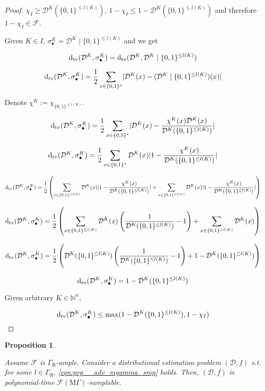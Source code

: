 \documentclass[11pt]{article}
\numberwithin{equation}{section}
\theoremstyle{definition}
\theoremstyle{plain}
\newtheorem{proposition}{Proposition}[section]
\newcommand{\Bool}{\{0,1\}}
\newcommand{\Words}{{\Bool^*}}
\newcommand{\WordsLen}[1]{{\Bool^{#1}}}
\newcommand{\Dtv}{\operatorname{d}_{\textnormal{tv}}}
\newcommand{\Nats}{\mathbb{N}}
\newcommand{\Abs}[1]{\lvert #1 \rvert}
\newcommand{\Dist}{\mathcal{D}}
\newcommand{\GrowA}{\Gamma_{\mathfrak{A}}}
\newcommand{\MGrow}{\mathrm{M}\Gamma}
\newcommand{\Fall}{\mathcal{F}}
\newcommand{\EMG}{\Fall(\MGrow)}
\begin{document}
\begin{proof}

$\chi_I \geq \Dist^{K}(\Bool^{\leq l(K)})$, $1 - \chi_{I} \leq 1 - \Dist^{K}(\Bool^{\leq l(K)})$ and therefore $1 - \chi_I \in \Fall$.

Given $K \in I$, ${\sigma_\bullet^K = \Dist^{K} \mid \Bool^{\leq l(K)}}$ and we get

$$\Dtv(\Dist^{K}, \sigma_\bullet^K) = \Dtv(\Dist^{K}, \Dist^{K} \mid \Bool^{\leq l(K)})$$

$$\Dtv(\Dist^{K}, \sigma_\bullet^K) = \frac{1}{2} \sum_{x \in \Words} \Abs{\Dist^{K}(x)-(\Dist^{K} \mid \WordsLen{\leq l(K)})(x)}$$

Denote $\chi^K:=\chi_{\WordsLen{\leq l(K)}}$.

$$\Dtv(\Dist^{K}, \sigma_\bullet^K) = \frac{1}{2} \sum_{x \in \Words} \Abs{\Dist^{K}(x)-\frac{\chi^K(x)\Dist^{K}(x)}{\Dist^{K}(\WordsLen{\leq l(K)})}}$$

$$\Dtv(\Dist^{K}, \sigma_\bullet^K) = \frac{1}{2} \sum_{x \in \Words} \Dist^{K}(x) \Abs{1-\frac{\chi^K(x)}{\Dist^{K}(\Bool^{\leq l(K)})}}$$

$$\Dtv(\Dist^{K}, \sigma_\bullet^K) = \frac{1}{2} \left(\sum_{x \in \Bool^{\leq l(K)}} \Dist^{K}(x) \Abs{1-\frac{\chi^K(x)}{\Dist^{K}(\Bool^{\leq l(K)})}}+\sum_{x \in \Bool^{>l(K)}} \Dist^{K}(x) \Abs{1-\frac{\chi^K(x)}{\Dist^{K}(\Bool^{\leq l(K)})}}\right)$$

$$\Dtv(\Dist^{K}, \sigma_\bullet^K) = \frac{1}{2} \left(\sum_{x \in \Bool^{\leq l(K)}} \Dist^{K}(x)\left(\frac{1}{\Dist^{K}(\Bool^{\leq l(K)})}-1\right)+\sum_{x \in \Bool^{>l(K)}} \Dist^{K}(x)\right)$$

$$\Dtv(\Dist^{K}, \sigma_\bullet^K) = \frac{1}{2} \left(\Dist^{K}(\Bool^{\leq l(K)})\left(\frac{1}{\Dist^{K}(\Bool^{\leq l(K)})}-1\right)+1 - \Dist^{K}(\Bool^{\leq l(K)})\right)$$

$$\Dtv(\Dist^{K}, \sigma_\bullet^K) = 1-\Dist^{K}(\Bool^{\leq l(K)})$$

Given arbitrary $K \in \Nats^n$,

$$\Dtv(\Dist^{K}, \sigma_\bullet^K) \leq \max(1-\Dist^{K}(\Bool^{\leq l(K)}), 1-\chi_I)$$
\end{proof}

\begin{samepage}
\begin{proposition}
\label{prp:adv_mgamma_gen}

Assume $\Fall$ is $\GrowA$-ample. Consider a distributional estimation problem $(\Dist,f)$ s.t. for some $l \in \GrowA$, \ref{eqn:prp__adv_mgamma_smp} holds. Then, $(\Dist,f)$ is polynomial-time $\EMG$-samplable. 

\end{proposition}
\end{samepage}
\end{document}
